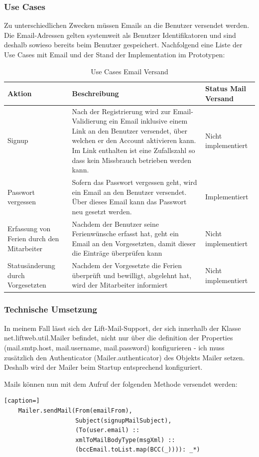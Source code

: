 \subsubsection{Use Cases}
Zu unterschiedlichen Zwecken m\"ussen  Emails an die Benutzer versendet werden. Die Email-Adressen gelten systemweit als Benutzer Identifikatoren und sind deshalb sowieso bereits beim Benutzer gespeichert. Nachfolgend eine Liste der Use Cases mit Email und der Stand der Implementation im Prototypen:
 \begin{longtable}{|p{3cm}|p{7cm}|p{3cm}|}
      \caption{Use Cases Email Versand}\\
\hline
  \textbf{Aktion} & \textbf{Beschreibung} & \textbf{Status Mail Versand}\\
  \hline
  Signup&Nach der Registrierung wird zur Email-Validierung ein Email inklusive einem Link an den Benutzer versendet, \"uber welchen er den Account aktivieren kann. Im Link enthalten ist eine Zufallszahl so dass kein Missbrauch betrieben werden kann. & Nicht implementiert\\
  \hline
  Passwort vergessen&Sofern das Passwort vergessen geht, wird ein Email an den Benutzer versendet. \"Uber dieses Email kann das Passwort neu gesetzt werden. & Implementiert\\
  \hline
  Erfassung von Ferien durch den Mitarbeiter & Nachdem der Benutzer seine Ferienw\"unsche erfasst hat, geht ein Email an den Vorgesetzten, damit dieser die Eintr\"age \"uberpr\"ufen kann & Nicht implementiert \\
  \hline
  Status\"anderung durch Vorgesetzten & Nachdem der Vorgesetzte die Ferien \"uberpr\"uft und bewilligt, abgelehnt hat, wird der Mitarbeiter informiert & Nicht implementiert\\
  \hline
\end{longtable}
 
 \subsubsection{Technische Umsetzung}
 In meinem Fall l\"asst sich der Lift-Mail-Support, der sich innerhalb der Klasse net.liftweb.util.Mailer befindet, nicht nur \"uber die definition der Properties (mail.smtp.host, mail.username, mail.password) konfigurieren - ich muss zus\"atzlich den Authenticator (Mailer.authenticator) des Objekts Mailer setzen. Deshalb wird der Mailer beim Startup entsprechend konfiguriert.

 Mails k\"onnen nun mit dem Aufruf der folgenden Methode versendet werden:
\begin{lstlisting}[caption=]
    Mailer.sendMail(From(emailFrom), 
                    Subject(signupMailSubject),
                    (To(user.email) :: 
                    xmlToMailBodyType(msgXml) ::
                    (bccEmail.toList.map(BCC(_)))): _*)
\end{lstlisting} 

